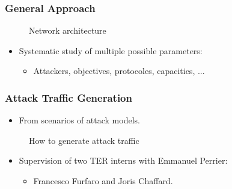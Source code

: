 \documentclass{beamer}
\begin{document}
\begin{frame}
    \frametitle{General Approach}

    \vspace{-2em}
    \begin{figure}[htb]
        \resizebox{\textwidth}{!}{
            
        }
        \caption{Network architecture}
    \end{figure}
    \vfill
    \begin{itemize}
        \item Systematic study of multiple possible parameters:
        \begin{itemize}
            \item Attackers, objectives, protocoles, capacities, ...
        \end{itemize}
    \end{itemize}
\end{frame}

\begin{frame}
    \frametitle{Attack Traffic Generation}

    \begin{itemize}
        \item From scenarios of attack models.
    \end{itemize}
    \vfill
    \begin{figure}[htb]
        \resizebox{.8\textwidth}{!}{
            
        }
        \caption{How to generate attack traffic}
    \end{figure}
    \vfill
    \begin{itemize}
        \item Supervision of two TER interns with Emmanuel Perrier:
        \begin{itemize}
            \item Francesco Furfaro and Joris Chaffard.
        \end{itemize}
    \end{itemize}
\end{frame}
\end{document}
